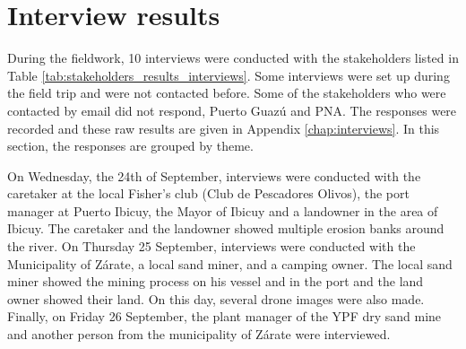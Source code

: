 \section{Interview results}
\label{sect:interviewresults}

During the fieldwork, 10 interviews were conducted with the stakeholders listed in Table \ref{tab:stakeholders_results_interviews}. Some interviews were set up during the field trip and were not contacted before. Some of the stakeholders who were contacted by email did not respond, Puerto Guazú and PNA. The responses were recorded and these raw results are given in Appendix \ref{chap:interviews}. In this section, the responses are grouped by theme.

On Wednesday, the 24th of September, interviews were conducted with the caretaker at the local Fisher's club (Club de Pescadores Olivos), the port manager at Puerto Ibicuy, the Mayor of Ibicuy and a landowner in the area of Ibicuy. The caretaker and the landowner showed multiple erosion banks around the river. On Thursday 25 September, interviews were conducted with the Municipality of Zárate, a local sand miner, and a camping owner. The local sand miner showed the mining process on his vessel and in the port and the land owner showed their land. On this day, several drone images were also made. Finally, on Friday 26 September, the plant manager of the YPF dry sand mine and another person from the municipality of Zárate were interviewed. 

